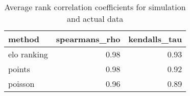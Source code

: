 \begin{table}[ht]
\centering
\begin{tabular}{lrr}
  \hline
method & spearmans\_rho & kendalls\_tau \\ 
  \hline
elo ranking & 0.98 & 0.93 \\ 
  points & 0.98 & 0.92 \\ 
  poisson & 0.96 & 0.89 \\ 
   \hline
\end{tabular}
\caption{Average rank correlation coefficients for simulation and actual data} 
\end{table} 
